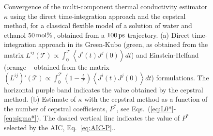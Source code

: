 \begin{figure}
    \begin{center}
    \end{center}
	\caption{Convergence of the multi-component thermal conductivity estimator $\kappa$ using the direct time-integration approach and the cepstral method, for a classical flexible model of a solution of water and ethanol $50\,\mathrm{mol}\%$, obtained from a $100\,\mathrm{ps}$ trajectory.
(a) Direct time-integration approach in its Green-Kubo (green, as obtained from the matrix $L^{ij}(\mathcal{T})\propto\int_0^\mathcal{T} \left\langle J^i(t) J^j(0) \right\rangle dt $) and Einstein-Helfand (orange -- obtained from the  matrix $\left (L^{ij}\right )'(\mathcal{T}) \propto  \int_0^\mathcal{T}\left(1-\frac{t}{\mathcal{T}}\right) \left \langle J^i(t) J^j(0) \right \rangle dt$) formulations. The horizontal purple band indicates the value obtained by the cepstral method.
(b) Estimate of $\kappa$ with the cepstral method as a function of the number of cepstral coefficients, $P^*$, see Eqs.~(\ref{eq:L0*}-\ref{eq:sigma*}). The dashed vertical line indicates the value of $P^*$ selected by the AIC, Eq.~\eqref{eq:AIC-P}..
}  \label{fig:twoCompConvergence}
\end{figure}


